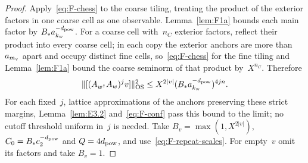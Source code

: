 \begin{proof}
Apply~\eqref{eq:F-chess} to the coarse tiling, treating the product of the exterior factors in one coarse cell as one observable. Lemma~\ref{lem:F1a} bounds each main factor by $B_*a_{k_{\rm w}}^{-d_{\rm pow}}$. For a coarse cell with~$n_C$ exterior factors, reflect their product into every coarse cell; in each copy the exterior anchors are more than~$a_{m_{\rm v}}$ apart and occupy distinct fine cells, so~\eqref{eq:F-chess} for the fine tiling and Lemma~\ref{lem:F1a} bound the coarse seminorm of that product by~$X^{n_C}$. Therefore
\begin{equation*}
\|[(A_{w^\dagger}A_w)^jv]\|_{\rm OS}^2
\le X^{2|v|}(B_*a_{k_{\rm w}}^{-d_{\rm pow}})^{4jn}.
\end{equation*}
For each fixed~$j$, lattice approximations of the anchors preserving these strict margins, Lemma~\ref{lem:E3.2} and~\eqref{eq:F-conf} pass this bound to the limit; no cutoff threshold uniform in~$j$ is needed. Take $B_v=\max(1,X^{2|v|})$, $C_0=B_*c_2^{-d_{\rm pow}}$ and $Q=4d_{\rm pow}$, and use~\eqref{eq:F-repeat-scales}. For empty~$v$ omit its factors and take $B_v=1$.
\end{proof}

